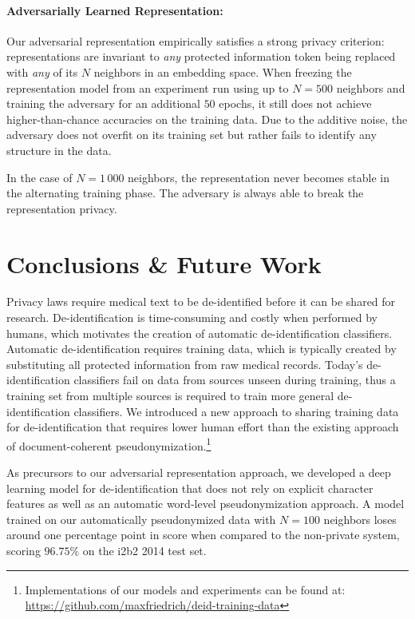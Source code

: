\paragraph{Adversarially Learned Representation:}
%
Our adversarial representation empirically satisfies a strong privacy criterion: representations are invariant to \textit{any} protected information token being replaced with \textit{any} of its $N$ neighbors in an embedding space.
%
When freezing the representation model from an experiment run using up to $N = 500$ neighbors and training the adversary for an additional $50$ epochs, it still does not achieve higher-than-chance accuracies on the training data.
%
Due to the additive noise, the adversary does not overfit on its training set but rather fails to identify any structure in the data.

%
In the case of $N = 1\,000$ neighbors, the representation never becomes stable in the alternating training phase.
%
The adversary is always able to break the representation privacy.

\section{Conclusions \& Future Work}
%
Privacy laws require medical text to be de-identified before it can be shared for research.
%
De-identifi\-ca\-tion is time-consuming and costly when performed by humans, which motivates the creation of automatic de-identification classifiers.
%
Automatic de-identification requires training data, which is typically created by substituting all protected information from raw medical records.
%
Today's de-identification classifiers fail on data from sources unseen during training, thus a training set from multiple sources is required to train more general de-identification classifiers.
%
We introduced a new approach to sharing training data for de-identification that requires lower human effort than the existing approach of document-coherent pseudonymization.\footnote{Implementations of our models and experiments can be found at: \url{https://github.com/maxfriedrich/deid-training-data}}

As precursors to our adversarial representation approach, we developed a deep learning model for de-identification that does not rely on explicit character features as well as an automatic word-level pseudonymization approach.
%
A model trained on our automatically pseudonymized data with $N=100$ neighbors loses around one percentage point in \fone score when compared to the non-private system, scoring $96.75\%$ on the i2b2 2014 test set.

